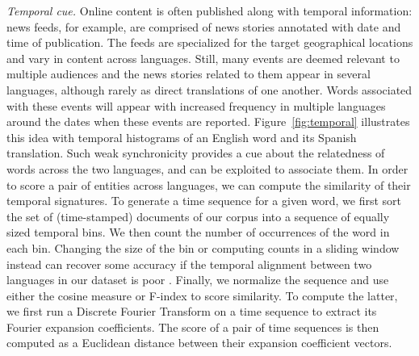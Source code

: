 \documentclass{article}
\newcommand{\mtodo}[1]{}
\newcommand{\figref}[1]{Figure~\ref{#1}}
\begin{document}
\noindent\emph{Temporal cue.} Online content is often published along with temporal information: news feeds, for example, are comprised of news stories annotated with date and time of publication.  The feeds are specialized for the target geographical locations and vary in content across languages.  Still, many events are deemed relevant to multiple audiences and the news stories related to them appear in several languages, although rarely as direct translations of one another.  Words associated with these events will appear with increased frequency in multiple languages around the dates when these events are reported.  \figref{fig:temporal} illustrates this idea with temporal histograms of an English word and its Spanish translation. Such weak synchronicity provides a cue about the relatedness of words across the two languages, and can be exploited to associate them.  In order to score a pair of entities across languages, we can compute the similarity of their temporal signatures.\mtodo{\figref{fig:temporal} is from Europarl, add the one from the proposal instead.}  To generate a time sequence for a given word, we first sort the set of (time-stamped) documents of our corpus into a sequence of equally sized temporal bins.  We then count the number of occurrences of the word in each bin.  Changing the size of the bin or computing counts in a sliding window instead can recover some accuracy if the temporal alignment between two languages in our dataset is poor \cite{Klementiev:2006b}.  Finally, we normalize the sequence and use either the cosine measure or F-index \cite{Hetland:2004} to score similarity. To compute the latter, we first run a Discrete Fourier Transform on a time sequence to extract its Fourier expansion coefficients. The score of a pair of time sequences is then computed as a Euclidean distance between their expansion coefficient vectors. \\
\end{document}
